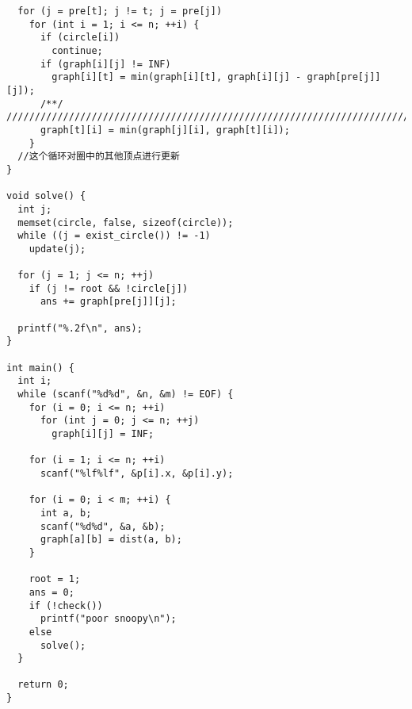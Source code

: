 \begin{lstlisting}
  for (j = pre[t]; j != t; j = pre[j])
    for (int i = 1; i <= n; ++i) {
      if (circle[i])
        continue;
      if (graph[i][j] != INF)
        graph[i][t] = min(graph[i][t], graph[i][j] - graph[pre[j]][j]);
      /**/ //////////////////////////////////////////////////////////////////////////
      graph[t][i] = min(graph[j][i], graph[t][i]);
    }
  //这个循环对圈中的其他顶点进行更新
}

void solve() {
  int j;
  memset(circle, false, sizeof(circle));
  while ((j = exist_circle()) != -1)
    update(j);

  for (j = 1; j <= n; ++j)
    if (j != root && !circle[j])
      ans += graph[pre[j]][j];

  printf("%.2f\n", ans);
}

int main() {
  int i;
  while (scanf("%d%d", &n, &m) != EOF) {
    for (i = 0; i <= n; ++i)
      for (int j = 0; j <= n; ++j)
        graph[i][j] = INF;

    for (i = 1; i <= n; ++i)
      scanf("%lf%lf", &p[i].x, &p[i].y);

    for (i = 0; i < m; ++i) {
      int a, b;
      scanf("%d%d", &a, &b);
      graph[a][b] = dist(a, b);
    }

    root = 1;
    ans = 0;
    if (!check())
      printf("poor snoopy\n");
    else
      solve();
  }

  return 0;
}

\end{lstlisting}